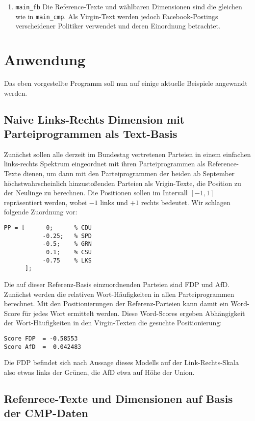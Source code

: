 \begin{enumerate}[(a)]
\begin{enumerate}
\item \verb|main_fb| \newline
Die Reference-Texte und wählbaren Dimensionen sind die gleichen wie in \verb|main_cmp|. Als Virgin-Text werden jedoch Facebook-Postings verscheidener Politiker verwendet und deren Einordnung betrachtet. 

\end{enumerate}

   
\end{enumerate}


\section{Anwendung}
Das eben vorgestellte Programm soll nun auf einige aktuelle Beispiele angewandt werden.
    \subsection{Naive Links-Rechts Dimension mit Parteiprogrammen als Text-Basis}
    Zunächst sollen alle derzeit im Bundestag vertretenen Parteien in einem einfachen links-rechts Spektrum eingeordnet mit ihren Parteiprogrammen als Reference-Texte dienen, um dann mit den Parteiprogrammen der beiden ab September höchstwahrscheinlich hinzustoßenden Parteien als Vrigin-Texte, die Position zu der Neulinge zu berechnen. Die Positionen sollen im Intervall $[-1,1]$ repräsentiert werden, wobei $-1$ links und $+1$ rechts bedeutet. Wir schlagen folgende Zuordnung vor:
    \begin{lstlisting}[style=Matlab-editor]
PP = [      0;      % CDU
           -0.25;   % SPD
           -0.5;    % GRN
            0.1;    % CSU
           -0.75    % LKS
      ];    
    \end{lstlisting}
      
     Die auf dieser Referenz-Basis einzuordnenden Parteien sind FDP und AfD. 
     Zunächst werden die relativen Wort-Häufigkeiten in allen Parteiprogrammen berechnet. 
     Mit den Positionierungen der Referenz-Parteien kann damit ein Word-Score für jedes Wort ermittelt werden.
     Diese Word-Scores ergeben Abhängigkeit der Wort-Häufigkeiten in den Virgin-Texten die gesuchte Positionierung:
    \begin{lstlisting}[style=Matlab-editor]
Score FDP  = -0.58553 
Score AfD  =  0.042483
    \end{lstlisting}
    Die FDP befindet sich nach Aussage dieses Modells auf der Link-Rechts-Skala also etwas links der Grünen, die AfD etwa auf Höhe der Union.
    
    
    \subsection{Refenrece-Texte und Dimensionen auf Basis der CMP-Daten}

